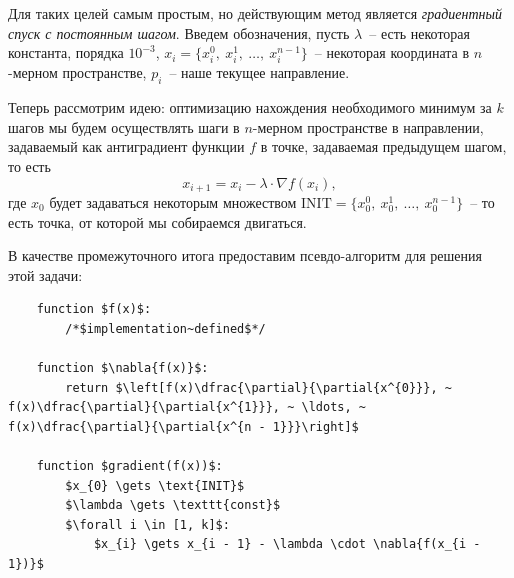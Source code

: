 \documentclass[12pt, a4paper, oneside, final]{article}
\begin{document}
	Для таких целей самым простым, но действующим метод является \textit{градиентный спуск с постоянным шагом}. 	Введем обозначения, пусть $\lambda$~-- есть некоторая константа, порядка $10^{-3}$, $x_{i} = \{x^{0}_{i}, ~ x^{1}_{i}, ~ \ldots, ~ x^{n - 1}_{i}\}$~-- некоторая координата в $n$-мерном пространстве, $p_{i}$~-- наше текущее направление.

	Теперь рассмотрим идею: оптимизацию нахождения необходимого минимум за $k$ шагов мы будем осуществлять шаги в $n$-мерном пространстве в направлении, задаваемый как антиградиент функции $f$ в точке, задаваемая предыдущем шагом, то есть
	\[
		x_{i + 1} = x_{i} - \lambda \cdot \nabla{f(x_{i})},
	\] где $x_{0}$ будет задаваться некоторым множеством $\text{INIT} = \{x^{0}_{0}, ~ x^{1}_{0}, ~ \ldots, ~ x^{n - 1}_{0}\}$~-- то есть точка, от которой мы собираемся двигаться.

	В качестве промежуточного итога предоставим псевдо-алгоритм для решения этой задачи:
	\begin{lstlisting}
	function $f(x)$:
		/*$implementation~defined$*/

	function $\nabla{f(x)}$:
		return $\left[f(x)\dfrac{\partial}{\partial{x^{0}}}, ~ f(x)\dfrac{\partial}{\partial{x^{1}}}, ~ \ldots, ~ f(x)\dfrac{\partial}{\partial{x^{n - 1}}}\right]$

	function $gradient(f(x))$:
		$x_{0} \gets \text{INIT}$
		$\lambda \gets \texttt{const}$
		$\forall i \in [1, k]$:
		    $x_{i} \gets x_{i - 1} - \lambda \cdot \nabla{f(x_{i - 1})}$
	\end{lstlisting}
\end{document}
